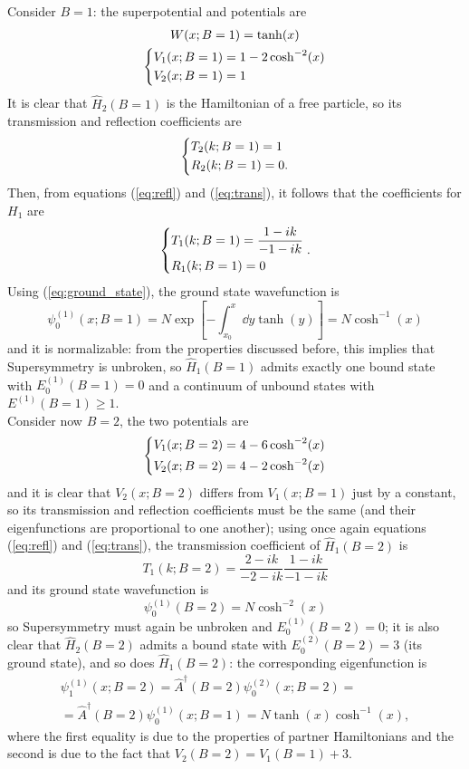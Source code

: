 Consider $B=1$: the superpotential and potentials are
\begin{gather*}
W(x;B=1)=\tanh(x)\\
\begin{dcases*}
    V_1(x;B=1)=1-2\cosh^{-2}(x)\\
V_2(x;B=1)=1
\end{dcases*}
\end{gather*}
It is clear that $\hat H_2(B=1)$ is the Hamiltonian of a free particle, so its transmission and
reflection coefficients are
$$
\begin{dcases*}
T_2(k;B=1)=1\\
R_2(k;B=1)=0.
\end{dcases*}
$$
Then, from equations (\ref{eq:refl}) and (\ref{eq:trans}), it follows that the coefficients for
$H_1$ are
$$
\begin{dcases*}
T_1(k;B=1)=\frac{1-ik}{-1-ik}\\
R_1(k;B=1)=0
\end{dcases*}.
$$
Using (\ref{eq:ground_state}), the ground state wavefunction is
$$\psi^{(1)}_0(x;B=1)=N\exp\left[-\int_{x_0}^{x}\dd y\tanh(y)\right]=N\cosh^{-1}(x)$$
and it is normalizable: from the properties discussed before, this
implies that Supersymmetry is unbroken, so $\hat H_1(B=1)$ admits exactly one bound
state with $E^{(1)}_0(B=1)=0$ and a continuum of unbound states with
$E^{(1)}(B=1)\geq1$.\\

Consider now $B=2$, the two potentials are
$$\begin{dcases*}
    V_1(x;B=2)=4-6\cosh^{-2}(x)\\
V_2(x;B=2)=4-2\cosh^{-2}(x)
\end{dcases*}
$$
and it is clear that $V_2(x;B=2)$ differs from $V_1(x;B=1)$ just by a constant, so its
transmission and reflection coefficients must be the same (and their eigenfunctions are
proportional to one another); using once again equations (\ref{eq:refl}) and (\ref{eq:trans}),
the transmission coefficient of $\hat H_1(B=2)$ is
$$
T_1(k;B=2)=\frac{2-ik}{-2-ik}\frac{1-ik}{-1-ik}
$$
and its ground state wavefunction is
$$\psi^{(1)}_0(B=2)=N\cosh^{-2}(x)$$
so Supersymmetry must again be unbroken and $E^{(1)}_0(B=2)=0$; it is also clear that
$\hat H_2(B=2)$ admits a bound state with $E^{(2)}_0(B=2)=3$ (its ground state), and so does
$\hat H_1(B=2)$: the corresponding eigenfunction is
\begin{gather*}
\psi^{(1)}_1(x;B=2)=\hat A^{\dagger}(B=2)\psi^{(2)}_0(x;B=2)=\\
=\hat A^\dagger(B=2)\psi^{(1)}_0(x;B=1)=N\tanh(x)\cosh^{-1}(x),
\end{gather*}
where the first equality is due to the properties of partner Hamiltonians and the second
is due to the fact that $V_2(B=2) = V_1(B=1)+3$.\\

